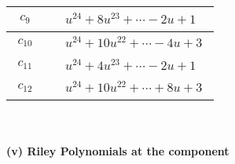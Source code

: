 \documentclass[1p]{elsarticle_modified}
\theoremstyle{definition}
\begin{document}
\begin{tabular}{m{50pt}|m{274pt}}
\hline $$\begin{aligned}c_{9}\end{aligned}$$&$\begin{aligned}
&u^{24}+8 u^{23}+\cdots-2 u+1
\end{aligned}$\\
\hline $$\begin{aligned}c_{10}\end{aligned}$$&$\begin{aligned}
&u^{24}+10 u^{22}+\cdots-4 u+3
\end{aligned}$\\
\hline $$\begin{aligned}c_{11}\end{aligned}$$&$\begin{aligned}
&u^{24}+4 u^{23}+\cdots-2 u+1
\end{aligned}$\\
\hline $$\begin{aligned}c_{12}\end{aligned}$$&$\begin{aligned}
&u^{24}+10 u^{22}+\cdots+8 u+3
\end{aligned}$\\
\hline
\end{tabular}\\~\\
\newpage\renewcommand{\arraystretch}{1}
\flushleft \textbf{(v) Riley Polynomials at the component}\newline \\
\end{document}

